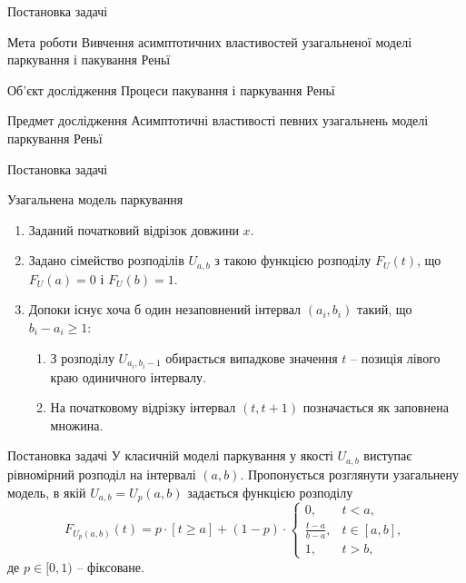 \begin{frame}{Постановка задачі}
	\vspace{-8pt}
	\begin{block}{Мета роботи}
		 Вивчення асимптотичних властивостей узагальненої моделі паркування і пакування Реньї
	\end{block} 

	\begin{block}{Об'єкт дослідження}
		Процеси пакування і паркування Реньї
	\end{block}
	
	\begin{block}{Предмет дослідження}
		Асимптотичні властивості певних узагальнень моделі паркування Реньї
	\end{block}
\end{frame}

\begin{frame}{Постановка задачі}
	\begin{block}{Узагальнена модель паркування}
	\begin{enumerate}
		\item Заданий початковий відрізок довжини $x$.
		\item Задано сімейство розподілів $U_{a,b}$ з такою функцією розподілу $F_{U}(t)$, що $F_{U}(a)=0$ і $F_{U}(b)=1$.
		\item Допоки існує хоча б один незаповнений інтервал $(a_i, b_i)$ такий, що $b_i-a_i \geq 1$:
		\begin{enumerate}
			\item З розподілу $U_{a_i,b_i - 1}$ обирається випадкове значення $t$ -- позиція лівого краю одиничного інтервалу.
			\item На початковому відрізку інтервал $(t, t+1)$ позначається як заповнена множина.
		\end{enumerate}
	\end{enumerate}
	\end{block}
\end{frame}

\begin{frame}{Постановка задачі}
	У класичній моделі паркування у якості $U_{a,b}$ виступає рівномірний розподіл на інтервалі $(a,b)$. Пропонується розглянути узагальнену модель, в якій  $U_{a,b}=U_{p}(a,b)$ задається функцією розподілу
	\begin{equation}
	\label{eq:general_dist}
	F_{U_{p}(a,b)}(t)=p \cdot [t \geq a] + (1-p)\cdot\begin{cases}
	0, &t<a,\\
	\frac{t-a}{b-a}, &t \in[a,b],\\
	1, &t > b,
	\end{cases}
	\end{equation}
	де $p \in [0,1)$ -- фіксоване.
\note{
}
\end{frame}

